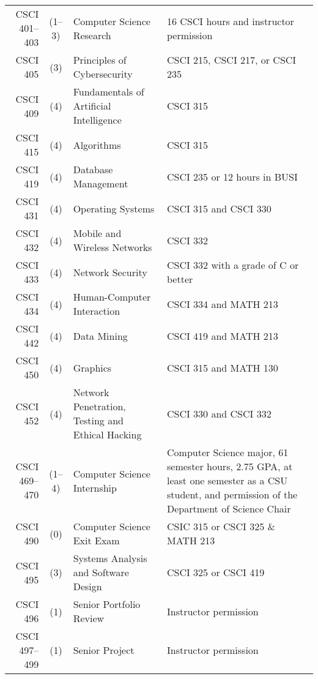 \begin{reqgroup}[left*=1pt,right*=1pt,bottom=0pt]{}
\begin{tabularx}{\textwidth}{ r c l  | X }
	CSCI 401--403 & (1--3) & Computer Science Research                   & 16 CSCI hours and instructor permission \\
	CSCI 405 & (3) & Principles of Cybersecurity                         & CSCI 215, CSCI 217, or CSCI 235 \\
	CSCI 409 & (4) & Fundamentals of Artificial Intelligence             & CSCI 315 \\
	CSCI 415 & (4) & Algorithms                                          & CSCI 315 \\
	CSCI 419 & (4) & Database Management                         & CSCI 235 or 12 hours in BUSI \\
	CSCI 431 & (4) & Operating Systems                         & CSCI 315 and CSCI 330 \\
	CSCI 432 & (4) & Mobile and Wireless Networks                         & CSCI 332 \\
	CSCI 433 & (4) & Network Security                         & CSCI 332 with a grade of C or better \\
	CSCI 434 & (4) & Human-Computer Interaction                         & CSCI 334 and MATH 213 \\
	CSCI 442 & (4) & Data Mining                         & CSCI 419 and MATH 213 \\
	CSCI 450 & (4) & Graphics                         & CSCI 315 and MATH 130 \\
	CSCI 452 & (4) & Network Penetration, Testing and Ethical Hacking    & CSCI 330 and CSCI 332 \\
	CSCI 469--470 & (1--4) & Computer Science Internship                  & Computer Science major, 61 semester hours, 2.75 GPA, at least one semester as a CSU student, and permission of the Department of Science Chair \\
	CSCI 490 & (0) & Computer Science Exit Exam                         &  CSIC 315 or CSCI 325 \& MATH 213 \\
	CSCI 495 & (3) & Systems Analysis and Software Design               & CSCI 325 or CSCI 419 \\
	CSCI 496 & (1) & Senior Portfolio Review                         & Instructor permission \\
	CSCI 497--499 & (1) & Senior Project                         & Instructor permission \\
\end{tabularx}
\end{reqgroup}

